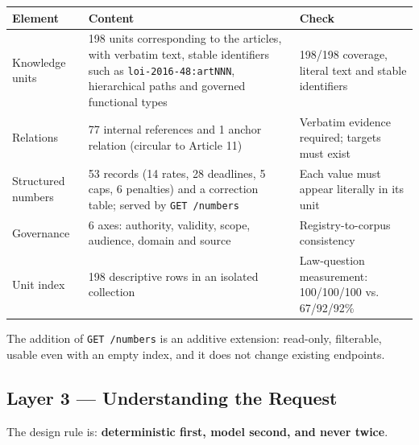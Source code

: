 \documentclass[a4paper,12pt,openany]{report}
\begin{document}
\begin{table}[htbp]
\centering
\small
\begin{tabular}{p{3.4cm}p{7.4cm}p{3.7cm}}
\toprule
\textbf{Element} & \textbf{Content} & \textbf{Check} \\
\midrule
Knowledge units & 198 units corresponding to the articles, with verbatim text, stable identifiers
such as \texttt{loi-2016-48:artNNN}, hierarchical paths and governed functional types & 198/198
coverage, literal text and stable identifiers \\
Relations & 77 internal references and 1 anchor relation (circular to Article 11) & Verbatim evidence
required; targets must exist \\
Structured numbers & 53 records (14 rates, 28 deadlines, 5 caps, 6 penalties) and a correction table;
served by \texttt{GET /numbers} & Each value must appear literally in its unit \\
Governance & 6 axes: authority, validity, scope, audience, domain and source & Registry-to-corpus
consistency \\
Unit index & 198 descriptive rows in an isolated collection & Law-question measurement:
100/100/100 vs. 67/92/92\% \\
\bottomrule
\end{tabular}
\end{table}

The addition of \texttt{GET /numbers} is an additive extension: read-only, filterable, usable even
with an empty index, and it does not change existing endpoints.

\subsection{Layer 3 — Understanding the Request}
The design rule is: \textbf{deterministic first, model second, and never twice}.
\end{document}
